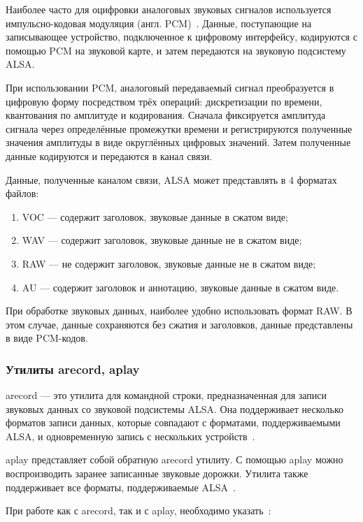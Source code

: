 Наиболее часто для оцифровки аналоговых звуковых сигналов используется импульсно-кодовая модуляция (англ. PCM)~\cite{alsa-arch}. Данные, поступающие на записывающее устройство, подключенное к цифровому интерфейсу, кодируются с помощью PCM на звуковой карте, и затем передаются на звуковую подсистему ALSA.

При использовании PCM, аналоговый передаваемый сигнал преобразуется в цифровую форму посредством трёх операций: дискретизации по времени, квантования по амплитуде и кодирования. Сначала фиксируется амплитуда сигнала через определённые промежутки времени и регистрируются полученные значения амплитуды в виде округлённых цифровых значений. Затем полученные данные кодируются и передаются в канал связи.

Данные, полученные каналом связи, ALSA может представлять в 4 форматах файлов:

\begin{enumerate}
  \item VOC --- содержит заголовок, звуковые данные в сжатом виде;
  \item WAV --- содержит заголовок, звуковые данные не в сжатом виде;
  \item RAW --- не содержит заголовок, звуковые данные не в сжатом виде;
  \item AU --- содержит заголовок и аннотацию, звуковые данные в сжатом виде.
\end{enumerate}

При обработке звуковых данных, наиболее удобно использовать формат RAW. В этом случае, данные сохраняются без сжатия и заголовков, данные представлены в виде PCM-кодов.

\subsubsection{Утилиты arecord, aplay}

arecord --- это утилита для командной строки, предназначенная для записи звуковых данных со звуковой подсистемы ALSA. Она поддерживает несколько форматов записи данных, которые совпадают с форматами, поддерживаемыми ALSA, и одновременную запись с нескольких устройств~\cite{arecord}.

aplay представляет собой обратную arecord утилиту. С помощью aplay можно воспроизводить заранее записанные звуковые дорожки. Утилита также поддерживает все форматы, поддерживаемые ALSA~\cite{aplay}.

При работе как с arecord, так и с aplay, необходимо указать~\cite{arecord, aplay}:

